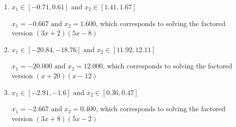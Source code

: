 \documentclass{extbook}[14pt]
\begin{document}
\begin{enumerate}
{\begin{enumerate}[label=\Alph*.]
$x_1 = -4.000 \text{ and } x_2 = 0.267$, which corresponds to solving the factored version $(x + 4)(15x -4)$
\item \( x_1 \in [-0.71, 0.61] \text{ and } x_2 \in [1.41, 1.67] \)

$x_1 = -0.667 \text{ and } x_2 = 1.600$, which corresponds to solving the factored version $(3x + 2)(5x -8)$
\item \( x_1 \in [-20.84, -18.76] \text{ and } x_2 \in [11.92, 12.11] \)

$x_1 = -20.000 \text{ and } x_2 = 12.000$, which corresponds to solving the factored version $(x + 20)(x -12)$
\item \( x_1 \in [-2.91, -1.6] \text{ and } x_2 \in [0.36, 0.47] \)

$x_1 = -2.667 \text{ and } x_2 = 0.400$, which corresponds to solving the factored version $(3x + 8)(5x -2)$
\end{enumerate}

}
\end{enumerate}
\end{document}

